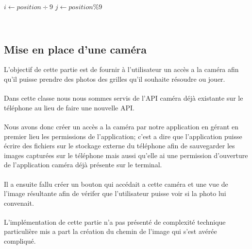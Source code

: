 \documentclass{article}
\begin{document}
\begin{algorithm}[H]
\SetAlgoLined
{}
$i \longleftarrow position \div 9  $
$j \longleftarrow position \% 9$\\
\end{algorithm}\\

\subsection{Mise en place d'une caméra}
L'objectif de cette partie  est de fournir à l'utilisateur un accès a la caméra afin qu'il puisse prendre des photos des grilles qu'il souhaite résoudre ou jouer.\\\\
Dans cette classe nous nous sommes servis de l'API caméra déjà existante sur le téléphone au lieu de faire une nouvelle API.\\\\
Nous avons donc créer un accès a la caméra par notre application en gérant en premier lieu les permissions de l'application; c'est a dire que l'application puisse écrire des fichiers sur le stockage externe du téléphone afin de sauvegarder les images capturées sur le téléphone mais aussi qu'elle ai une permission d'ouverture de l'application caméra déjà présente sur le terminal.\\\\
Il a ensuite fallu créer un bouton qui accédait a cette caméra et une vue de l'image résultante afin de vérifer que l'utilisateur puisse voir si la photo lui convenait.\\\\
L'implémentation de cette partie n'a pas présenté de complexité technique particulière mis a part la création du chemin de l'image qui s'est avérée compliqué.
\end{document}
